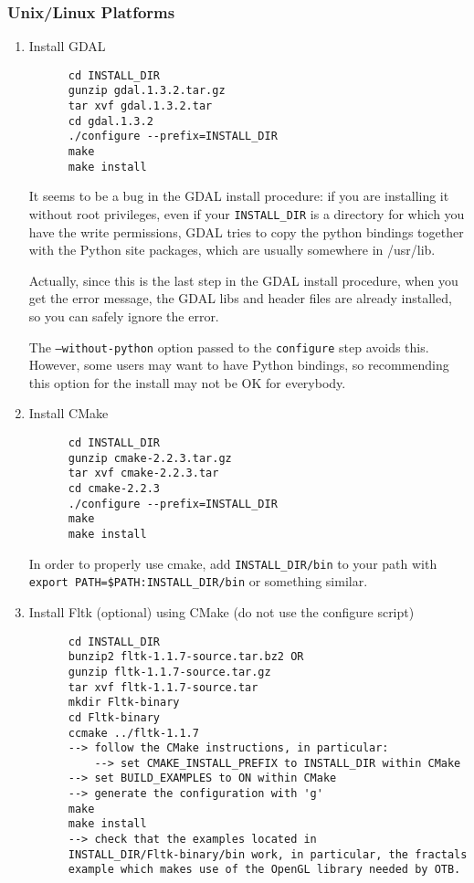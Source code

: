 \subsubsection{Unix/Linux Platforms}
\begin{enumerate}
    
\item Install GDAL
  \begin{verbatim}
      cd INSTALL_DIR
      gunzip gdal.1.3.2.tar.gz
      tar xvf gdal.1.3.2.tar
      cd gdal.1.3.2
      ./configure --prefix=INSTALL_DIR
      make
      make install
  \end{verbatim}

It seems to be a bug in the GDAL install procedure: if you are installing it without root privileges, even if your \texttt{INSTALL\_DIR} is a directory for which you have the write permissions, GDAL tries to copy the python bindings together with the Python site packages, which are usually somewhere in /usr/lib.

Actually, since this is the last step in the GDAL install procedure, when you get the error message, the GDAL libs and header files are already installed, so you can safely ignore the error.

The \texttt{--without-python} option passed to the \texttt{configure} step avoids this. However, some users may want to have Python bindings, so recommending this option for the install may not be OK for everybody. 

\item Install CMake
  \begin{verbatim}
      cd INSTALL_DIR
      gunzip cmake-2.2.3.tar.gz
      tar xvf cmake-2.2.3.tar
      cd cmake-2.2.3
      ./configure --prefix=INSTALL_DIR
      make
      make install
  \end{verbatim}
      In order to properly use cmake, add \texttt{INSTALL\_DIR/bin} to
      your path with \texttt{export PATH=\$PATH:INSTALL\_DIR/bin} or
      something similar.

\item Install Fltk (optional) using CMake (do not use the configure script)
  \begin{verbatim}
      cd INSTALL_DIR
      bunzip2 fltk-1.1.7-source.tar.bz2 OR
      gunzip fltk-1.1.7-source.tar.gz
      tar xvf fltk-1.1.7-source.tar
      mkdir Fltk-binary
      cd Fltk-binary
      ccmake ../fltk-1.1.7
      --> follow the CMake instructions, in particular:
          --> set CMAKE_INSTALL_PREFIX to INSTALL_DIR within CMake
	  --> set BUILD_EXAMPLES to ON within CMake
	  --> generate the configuration with 'g'
      make
      make install
      --> check that the examples located in
      INSTALL_DIR/Fltk-binary/bin work, in particular, the fractals
      example which makes use of the OpenGL library needed by OTB.
  \end{verbatim}
      


\end{enumerate}
